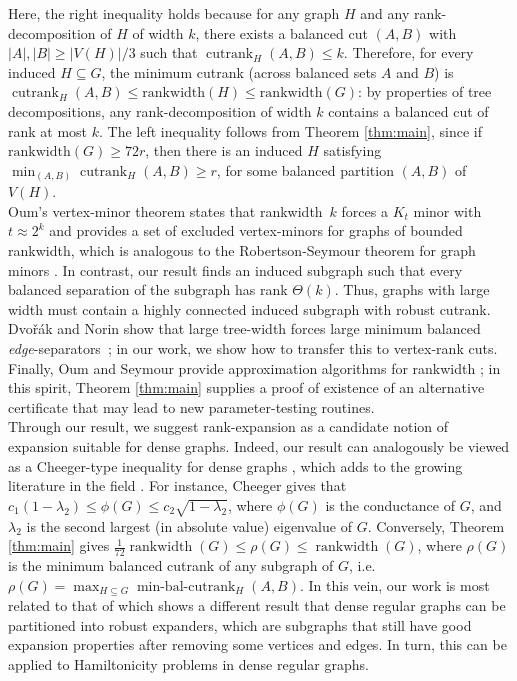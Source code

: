 \documentclass{article}
\theoremstyle{definition}
\begin{document}
\noindent Here, the right inequality holds because for any graph $H$ and any rank-decomposition of $H$ of width $k$, there exists a balanced cut $(A, B)$ with $|A|,|B|\geq |V(H)|/3$ such that $\operatorname{cutrank}_H(A,B) \leq k$. Therefore, for every induced $H\subseteq G$, the minimum cutrank (across balanced sets $A$ and $B$) is $\operatorname{cutrank}_H(A,B)\le \mathrm{rankwidth}(H)\le \mathrm{rankwidth}(G)$: by properties of tree decompositions, any rank-decomposition of width $k$ contains a balanced cut of rank at most $k$. The left inequality follows from Theorem \ref{thm:main}, since if $\mathrm{rankwidth}(G)\ge 72r$, then
there is an induced $H$ satisfying $\min_{(A,B)}\operatorname{cutrank}_H(A,B)\ge r$, for some balanced partition $(A,B)$ of $V(H)$.\\


Oum’s vertex-minor theorem states that rankwidth~$k$ forces a $K_t$ minor with $t\approx2^k$ and provides a set of excluded vertex-minors for graphs of bounded rankwidth, which is analogous to the Robertson-Seymour theorem for graph minors \cite{Oum_Seymour_2006}.  
In contrast, our result finds an {induced} subgraph such that  {every} balanced separation of the subgraph has rank $\Theta(k)$. Thus, graphs with large width must contain a highly connected induced subgraph with robust cutrank. Dvořák and Norin show that large tree-width forces large minimum balanced \emph{edge}-separators~\cite{Dvorak_Norin_2018}; in our work, we show how to transfer this to vertex-rank cuts. Finally, Oum and Seymour provide approximation algorithms for rankwidth \cite{Oum_Seymour_2006}; in this spirit, Theorem \ref{thm:main} supplies a proof of existence of an alternative certificate that may lead to new parameter-testing routines. \\

Through our result, we suggest rank-expansion as a candidate notion of expansion suitable for dense graphs. Indeed, our result can analogously be viewed as a Cheeger-type inequality for dense graphs \cite{Cheeger1970,AlonMilman1985}, which adds to the growing literature in the field \cite{khetan2018cheegerinequalitiesgraphlimits,jost2024cheegerinequalitiessimplicialcomplexes,10.1145/3564246.3585139,briani2022classcheegerinequalities, 10.1145/2582112.2582118, schild2018schurcomplementcheegerinequality, first2025cheegerinequalitycoboundaryexpansion}. For instance, Cheeger gives that $c_1(1 - \lambda_2) \leq \phi(G) \leq c_2\sqrt{1-\lambda_2}$, where $\phi(G)$ is the conductance of $G$, and $\lambda_2$ is the second largest (in absolute value) eigenvalue of $G$. Conversely, Theorem \ref{thm:main} gives $\frac{1}{72}\operatorname{rankwidth}(G) \leq \rho(G) \leq \operatorname{rankwidth}(G)$, where $\rho(G)$ is the minimum balanced cutrank of any subgraph of $G$, i.e. $\rho(G) = \max_{H\subseteq G} \operatorname{min-bal-cutrank}_H(A,B)$. In this vein, our work is most related to that of \cite{K_hn_2014} which shows a different result that dense regular graphs can be partitioned into robust expanders, which are subgraphs that still have good expansion properties after removing some vertices and edges. In turn, this can be applied to Hamiltonicity problems in dense regular graphs.
\end{document}
